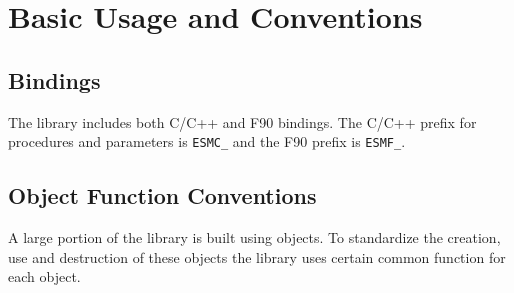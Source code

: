 
\section{Basic Usage and Conventions}

\subsection{Bindings}

The library includes both C/C++ and F90 bindings.  The C/C++ prefix
for procedures and parameters is {\tt ESMC\_} and the F90 prefix is
{\tt ESMF\_}.

\subsection{Object Function Conventions}

A large portion of the library is built using objects.  To standardize
the creation, use and destruction of these objects the library uses
certain common function for each object.

